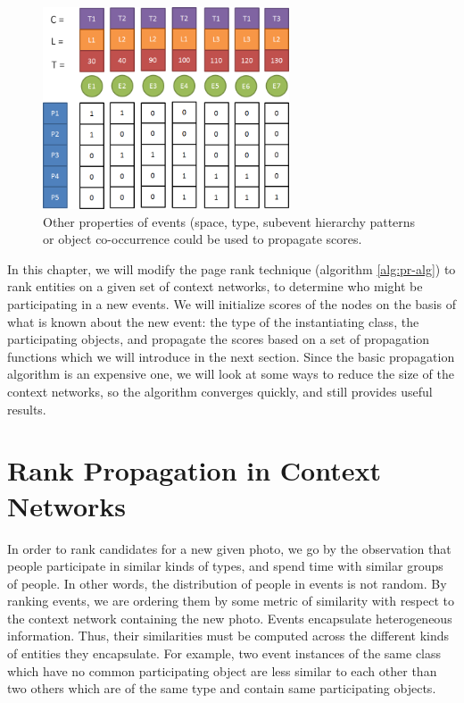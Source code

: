 \begin{figure}[h]
\centering
\includegraphics[width=0.65\textwidth]{media/chapter6/multi-property-example.png}
\caption{Other properties of events (space, type, subevent hierarchy patterns or object co-occurrence could be used to propagate scores.}
\label{fig:location-example}
\end{figure}

In this chapter, we will modify the page rank technique (algorithm \ref{alg:pr-alg}) to rank entities on a given set of context networks, to determine who might be participating in a new events. We will initialize scores of the nodes on the basis of what is known about the new event: the type of the instantiating class, the participating objects, and propagate the scores based on a set of propagation functions which we will introduce in the next section. Since the basic propagation algorithm is an expensive one, we will look at some ways to reduce the size of the context networks, so the algorithm converges quickly, and still provides useful results.

\section{Rank Propagation in Context Networks}

In order to rank candidates for a new given photo, we go by the observation that people participate in similar kinds of types, and spend time with similar groups of people. In other words, the distribution of people in events is not random. By ranking events, we are ordering them by some metric of similarity with respect to the context network containing the new photo. Events encapsulate heterogeneous information. Thus, their similarities must be computed across the different kinds of entities they encapsulate. For example, two event instances of the same class which have no common participating object are less similar to each other than two others which are of the same type and contain same participating objects.

